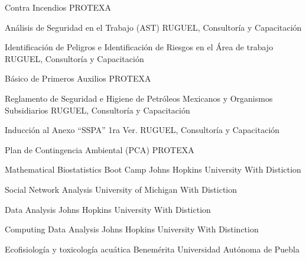 \documentclass[11pt, letterpaper, roman]{moderncv}
\begin{document}
		{Contra Incendios}
		{\newline PROTEXA}
		{}
		{}
		{}
		
		{Análisis de Seguridad en el Trabajo (AST)}
		{\newline RUGUEL, Consultoría y Capacitación}
		{}
		{}
		{}
		
		{Identificación de Peligros e Identificación de Riesgos en el Área de 
		trabajo}
		{\newline RUGUEL, Consultoría y Capacitación}
		{}
		{}
		{}

		{Básico de Primeros Auxilios}
		{\newline PROTEXA}
		{}
		{}
		{}

		{Reglamento de Seguridad e Higiene de Petróleos Mexicanos y Organismos 
		Subsidiarios}
		{\newline RUGUEL, Consultoría y Capacitación}
		{}
		{}
		{}

		{Inducción al Anexo ``SSPA'' 1ra Ver.}
		{\newline RUGUEL, Consultoría y Capacitación}
		{}
		{}
		{}

		{Plan de Contingencia Ambiental (PCA)}
		{\newline PROTEXA}
		{}
		{}
		{}
		
		{Mathematical Biostatistics Boot Camp}
		{\newline Johns Hopkins University}
		{\newline With Distiction}
		{}
		{}

		{Social Network Analysis}
		{\newline University of Michigan}
		{\newline With Distiction}
		{}
		{}

		{Data Analysis}
		{\newline Johns Hopkins University}
		{\newline With Distiction}
		{}
		{}

		{Computing Data Analysis}
		{\newline Johns Hopkins University}
		{\newline With Distinction}
		{}
		{}

		{Ecofisiología y toxicología acuática}
		{\newline Benemérita Universidad Autónoma de Puebla}
		{}
		{}
		{}
\end{document}
